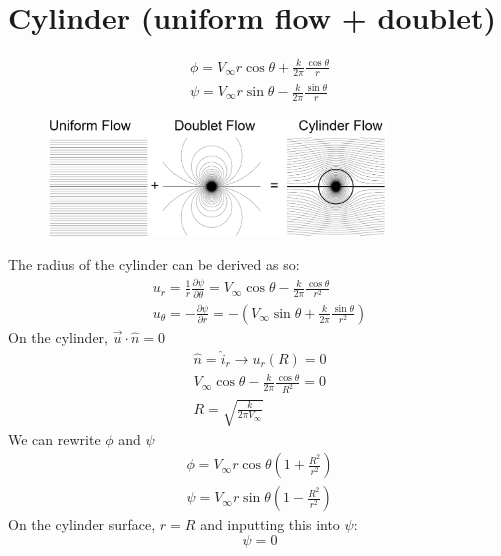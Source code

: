 \documentclass[class=report, crop=false, 12pt,a4paper]{standalone}
\begin{document}
\section{Cylinder (uniform flow + doublet)}
\begin{gather}
  \phi = V_{\infty}r\cos\theta + \frac{k}{2\pi} \frac{\cos\theta}{r}\\
  \psi = V_{\infty} r\sin\theta - \frac{k}{2\pi}\frac{\sin\theta}{r}
\end{gather}
\begin{figure}[H]
  \centering
  \includegraphics[width = 0.8\textwidth]{../img/diagram22.png}
\end{figure}
The radius of the cylinder can be derived as so:
\begin{gather}
  u_r = \frac{1}{r}\frac{\partial \psi}{\partial \theta} = V_{\infty} \cos\theta - \frac{k}{2\pi}\frac{\cos\theta}{r^2}\\
  u_{\theta} = -\frac{\partial \psi}{\partial r} = - \left( V_{\infty} \sin\theta + \frac{k}{2\pi}\frac{\sin\theta}{r^2} \right)
\end{gather}
On the cylinder, $\vec{u}\cdot\hat{n} = 0$
\begin{gather}
  \hat{n} = \hat{i}_r \rightarrow u_r(R)=0\\
  V_{\infty}\cos\theta - \frac{k}{2\pi}\frac{\cos\theta}{R^2} = 0\\
  R = \sqrt{\frac{k}{2\pi V_{\infty}}}
\end{gather}
We can rewrite $\phi$ and $\psi$
\begin{gather}
  \phi = V_{\infty}r\cos\theta\left(1+\frac{R^2}{r^2}\right)\\
  \psi = V_{\infty}r\sin\theta\left(1-\frac{R^2}{r^2}\right)
\end{gather}
On the cylinder surface, $r =R$ and inputting this into $\psi$:
\begin{equation}
  \psi = 0
\end{equation}
\end{document}
